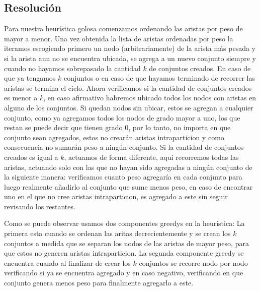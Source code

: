 \subsection{Resoluci\'on}

Para nuestra heurística golosa comenzamos ordenando las aristas por peso de mayor a menor. Una vez obtenida la lista de aristas ordenadas por peso la iteramos escogiendo primero un nodo (arbitrariamente) de la arista más pesada y si la arista aun no se encuentra ubicada, se agrega a un nuevo conjunto siempre y cuando no hayamos sobrepasado la cantidad $k$ de conjuntos creados. En caso de que ya tengamos $k$ conjuntos o en caso de que hayamos terminado de recorrer las aristas se termina el ciclo.
Ahora verificamos si la cantidad de conjuntos creados es menor a $k$, en caso afirmativo habremos ubicado todos los nodos con aristas en alguno de los conjuntos.
Si quedan nodos sin ubicar, estos se agregan a cualquier conjunto, como ya agregamos todos los nodos de grado mayor a uno, los que restan se puede decir que tienen grado 0, por lo tanto, no importa en que conjunto sean agregados, estos no crearán aristas intraparticion y como consecuencia no sumarán peso a ningún conjunto.
Si la cantidad de conjuntos creados es igual a $k$, actuamos de forma diferente, aquí recorremos todas las aristas, actuando solo con las que no hayan sido agregadas a ningún conjunto de la siguiente manera: verificamos cuanto peso agregaría en cada conjunto para luego realmente añadirlo al conjunto que sume menos peso, en caso de encontrar uno en el que no cree aristas intraparticion, es agregado a este sin seguir revisando los restantes.

Como se puede observar usamos dos componentes greedys en la heurística:
La primera esta cuando se ordenan las aritas decrecientemente y se crean los $k$ conjuntos a medida que se separan los nodos de las aristas de mayor peso, para que estos no generen aristas intraparticion.
La segunda componente greedy se encuentra cuando al finalizar de crear los $k$ conjuntos se recorre nodo por nodo verificando si ya se encuentra agregado y en caso negativo, verificando en que conjunto genera menos peso para finalmente agregarlo a este.


